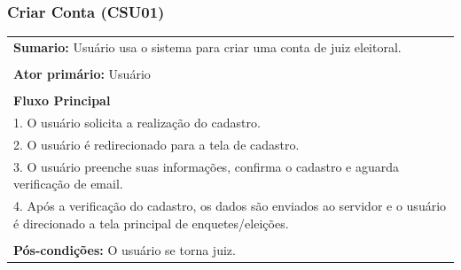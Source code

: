 \documentclass[a4paper,12pt]{report}
\begin{document}
\begin{center}
{\subsubsection*{Criar Conta (CSU01)}}
\end{center}
\markright{}
\begin{tabularx}{\textwidth}{|X|}\hline
	{\textbf{Sumario:}} Usuário usa o sistema para criar uma conta de juiz eleitoral. \\\\
	{\textbf{Ator primário:}} Usuário \\\\
	{\textbf{Fluxo Principal}} \\
	1. O usuário solicita a realização do cadastro. \\
	2. O usuário é redirecionado para a tela de cadastro. \\
	3. O usuário preenche suas informações, confirma o cadastro e aguarda verificação de email. \\
	4. Após a verificação do cadastro, os dados são enviados ao servidor e o usuário é direcionado a tela principal de enquetes/eleições. \\\\
	{\textbf{Pós-condições:}} O usuário se torna juiz. \\
	\hline
\end{tabularx}
\end{document}
